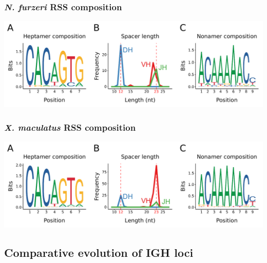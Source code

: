 \documentclass[presentation]{beamer}
\begin{document}
\begin{frame}
\frametitle{\textit{N. furzeri} RSS composition}
\centering
\includegraphics[width=\textwidth]{figs/pdf/extra/nfu-rss-seqlogo-all}
\end{frame}

\begin{frame}
\frametitle{\textit{X. maculatus} RSS composition}
\centering
\includegraphics[width=\textwidth]{figs/pdf/extra/xma-new-rss-seqlogo-all}
\end{frame}

\subsection*{Comparative evolution of IGH loci}
\end{document}
